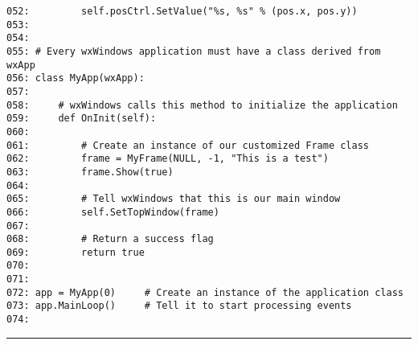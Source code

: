 \begin{verbatim}
052:         self.posCtrl.SetValue("%s, %s" % (pos.x, pos.y))
053:
054:
055: # Every wxWindows application must have a class derived from wxApp
056: class MyApp(wxApp):
057:
058:     # wxWindows calls this method to initialize the application
059:     def OnInit(self):
060:
061:         # Create an instance of our customized Frame class
062:         frame = MyFrame(NULL, -1, "This is a test")
063:         frame.Show(true)
064:
065:         # Tell wxWindows that this is our main window
066:         self.SetTopWindow(frame)
067:
068:         # Return a success flag
069:         return true
070:
071:
072: app = MyApp(0)     # Create an instance of the application class
073: app.MainLoop()     # Tell it to start processing events
074:
\end{verbatim}
\hrule



